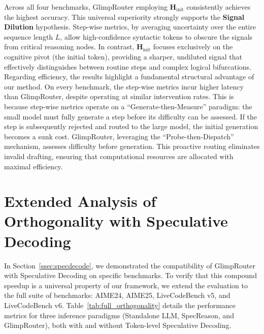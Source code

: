 \documentclass[11pt]{article}
\newcommand{\approach}{{GlimpRouter}\xspace}
\begin{document}
Across all four benchmarks, \approach employing $\mathbf{H}_\text{init}$ consistently achieves the highest accuracy.
This universal superiority strongly supports the \textbf{Signal Dilution} hypothesis. Step-wise metrics, by averaging uncertainty over the entire sequence length $L$, allow high-confidence syntactic tokens to obscure the signals from critical reasoning nodes.
In contrast, $\mathbf{H}_\text{init}$ focuses exclusively on the cognitive pivot (the initial token), providing a sharper, undiluted signal that effectively distinguishes between routine steps and complex logical bifurcations.
Regarding efficiency, the results highlight a fundamental structural advantage of our method.
On every benchmark, the step-wise metrics incur higher latency than \approach, despite operating at similar intervention rates.
This is because step-wise metrics operate on a ``Generate-then-Measure'' paradigm: the small model must fully generate a step before its difficulty can be assessed. If the step is subsequently rejected and routed to the large model, the initial generation becomes a sunk cost.
\approach, leveraging the ``Probe-then-Dispatch'' mechanism, assesses difficulty before generation. This proactive routing eliminates invalid drafting, ensuring that computational resources are allocated with maximal efficiency.


\section{Extended Analysis of Orthogonality with Speculative Decoding}
\label{app:orthogonality}

In Section~\ref{ssec:specdecode}, we demonstrated the compatibility of \approach with Speculative Decoding on specific benchmarks. To verify that this compound speedup is a universal property of our framework, we extend the evaluation to the full suite of benchmarks: AIME24, AIME25, LiveCodeBench v5, and LiveCodeBench v6.
Table~\ref{tab:full_orthogonality} details the performance metrics for three inference paradigms (Standalone LLM, SpecReason, and \approach), both with and without Token-level Speculative Decoding.
\end{document}
